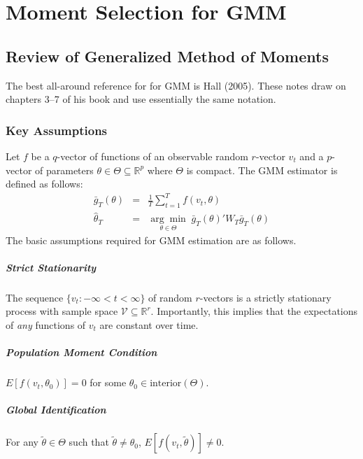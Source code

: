 \chapter{Moment Selection for GMM}



\section{Review of Generalized Method of Moments}
The best all-around reference for for GMM is Hall (2005). These notes draw on chapters 3--7 of his book and use essentially the same notation.

\subsection{Key Assumptions}
Let $f$ be a $q$-vector of functions of an observable random $r$-vector $v_t$ and a $p$-vector of parameters $\theta \in \Theta \subseteq \mathbb{R}^p$ where $\Theta$ is compact. The GMM estimator is defined as follows:
	\begin{eqnarray*}
		\bar{g}_T(\theta) &=& \frac{1}{T}\sum_{t=1}^T f(v_t, \theta)\\
		\widehat{\theta}_T &=& \underset{\theta \in \Theta}{\arg \min} \; \bar{g}_T(\theta)'W_T \bar{g}_T(\theta) 
	\end{eqnarray*}
The basic assumptions required for GMM estimation are as follows.

\paragraph{Strict Stationarity} The sequence $\{v_t\colon -\infty <t <\infty\}$ of random $r$-vectors is a strictly stationary process with sample space $\mathcal{V}\subseteq \mathbb{R}^r$. Importantly, this implies that the expectations of \emph{any} functions of $v_t$ are constant over time.

\paragraph{Population Moment Condition} $E[f(v_t, \theta_0)]=0$ for some $\theta_0 \in \mbox{interior}(\Theta)$.

\paragraph{Global Identification} For any $\widetilde{\theta}\in \Theta$ such that $\widetilde{\theta}\neq \theta_0$, $E[f(v_t,\widetilde{\theta})]\neq 0 $.


